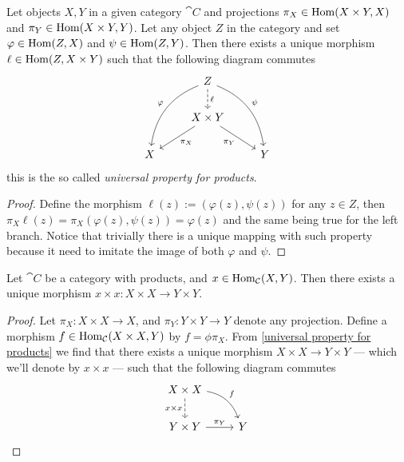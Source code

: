\begin{proposition}\label{universal property for products}
   Let objects \(X, Y\) in a given category \(\cat{C}\) and projections \(\pi_X
   \in \operatorname{Hom}(X \times Y, X)\) and \(\pi_Y \in \operatorname{Hom}(X \times Y, Y)\). Let any
   object \(Z\) in the category and set \(\varphi \in \operatorname{Hom}(Z, X)\) and \(\psi
   \in \operatorname{Hom}(Z, Y)\). Then there exists a unique morphism \(\ell \in \operatorname{Hom}(Z, X
   \times Y)\) such that the following diagram commutes
   \[
      \begin{tikzcd}
          & Z
          \ar[d, dashed, "\ell"]
          \ar[ddl, bend right, swap, "\varphi"]
          \ar[ddr, bend left, "\psi"]
            & \\
          & X \times Y \ar[dl, "\pi_X"] \ar[dr, swap, "\pi_Y"] \\
        X
          &
            & Y
      \end{tikzcd}
   \]
   this is the so called \emph{universal property for products}.
\end{proposition}

\begin{proof}
   Define the morphism \(\ell(z) := (\varphi(z), \psi(z))\) for any  \(z \in
   Z\), then \(\pi_X  \ell (z) = \pi_X(\varphi(z), \psi(z)) = \varphi(z)\)
   and the same being true for the left branch. Notice that trivially there is a
   unique mapping with such property because it need to imitate the image of
   both \(\varphi\) and \(\psi\).
\end{proof}

\begin{proposition}\label{prop: product-morphism}
  Let \(\cat C\) be a category with products, and \(x \in \operatorname{Hom}_{\mathcal C}(X, Y)\).
  Then there exists a unique morphism \(x \times x: X \times X \to Y \times Y\).
\end{proposition}

\begin{proof}
  Let \(\pi_X: X \times X \to X\), and \(\pi_Y: Y \times Y \to Y\) denote any
  projection. Define a morphism \(f \in \operatorname{Hom}_{\mathcal C}(X \times X, Y)\) by \(f =
  \phi \pi_X\). From \cref{universal property for products} we find that there
  exists a unique morphism \(X \times X \to Y \times Y\) --- which we'll denote
  by \(x \times x\) --- such that the following diagram commutes
  \[
    \begin{tikzcd}
      X \times X \ar[d, dashed, swap, "x \times x"] \ar[dr, bend left, "f"] \\
      Y \times Y \ar[r, "\pi_Y"] &Y
    \end{tikzcd}
  \]
\end{proof}

